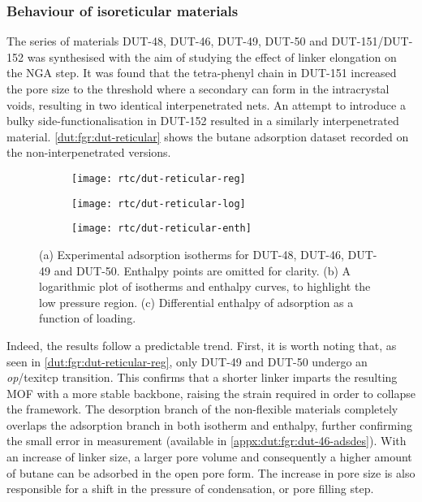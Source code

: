 \subsubsection{Behaviour of isoreticular materials}

The series of materials DUT-48, DUT-46, DUT-49, DUT-50 and DUT-151/DUT-152
was synthesised with the aim of studying the effect of linker 
elongation on the NGA step. It was found that the tetra-phenyl chain
in DUT-151 increased the pore size to the threshold 
where a secondary can form in the intracrystal voids, resulting 
in two identical interpenetrated nets. An attempt to introduce 
a bulky side-functionalisation in DUT-152 resulted in a similarly
interpenetrated material. \autoref{dut:fgr:dut-reticular} shows the
butane adsorption dataset recorded on the non-interpenetrated versions.

\begin{figure}[htb]
    \centering
    \begin{subfigure}{0.33\linewidth}
        \texttt{[image: rtc/dut-reticular-reg]}%
        \caption{}\label{dut:fgr:dut-reticular-reg}
    \end{subfigure}%
    \begin{subfigure}{0.33\linewidth}
        \texttt{[image: rtc/dut-reticular-log]}%
        \caption{}\label{dut:fgr:dut-reticular-log}
    \end{subfigure}%
    \begin{subfigure}{0.33\linewidth}
        \texttt{[image: rtc/dut-reticular-enth]}%
        \caption{}\label{dut:fgr:dut-reticular-enth}
    \end{subfigure}%
    \caption{(a) Experimental adsorption isotherms for DUT-48, DUT-46, DUT-49 and 
    DUT-50. Enthalpy points are omitted for clarity. (b) A logarithmic plot of 
    isotherms and enthalpy curves, to highlight the low pressure region. 
    (c) Differential enthalpy of adsorption as a function of loading.}%
    \label{dut:fgr:dut-reticular}
\end{figure}


Indeed, the results follow a predictable trend. First, it is worth 
noting that, as seen in \autoref{dut:fgr:dut-reticular-reg}, only DUT-49 
and DUT-50 undergo an \textit{op}/texit{cp} transition. This confirms that 
a shorter linker imparts the resulting MOF with a more stable backbone,
raising the strain required in order to collapse the framework.
The desorption branch of the non-flexible materials completely 
overlaps the adsorption branch in both isotherm and enthalpy, further
confirming the small error in measurement (available in 
\autoref{appx:dut:fgr:dut-46-adsdes}).
With an increase of linker size, a larger pore volume and consequently
a higher amount of butane can be adsorbed in the open pore form. 
The increase in pore size is also responsible for a shift in the pressure 
of condensation, or pore filling step.


